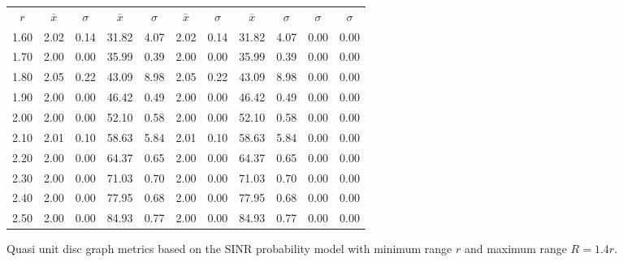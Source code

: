 \documentclass{article}
\begin{document}
\begin{figure}[h]
\begin{center}
\begin{tabular}{|r|rr|rr|rr|rr|rr|}
\hline
\multicolumn{1}{|c|}{$r$} & \multicolumn{1}{|c}{$\overline{x}$} & \multicolumn{1}{c|}{$\sigma$} & \multicolumn{1}{|c}{$\overline{x}$} & \multicolumn{1}{c|}{$\sigma$} & \multicolumn{1}{|c}{$\overline{x}$} & \multicolumn{1}{c|}{$\sigma$} & \multicolumn{1}{|c}{$\overline{x}$} & \multicolumn{1}{c|}{$\sigma$} & \multicolumn{1}{|c}{$\sigma$} & \multicolumn{1}{c|}{$\sigma$}\\
1.60 & 2.02 & 0.14 & 31.82 & 4.07 & 2.02 & 0.14 & 31.82 & 4.07 & 0.00 & 0.00\\
1.70 & 2.00 & 0.00 & 35.99 & 0.39 & 2.00 & 0.00 & 35.99 & 0.39 & 0.00 & 0.00\\
1.80 & 2.05 & 0.22 & 43.09 & 8.98 & 2.05 & 0.22 & 43.09 & 8.98 & 0.00 & 0.00\\
1.90 & 2.00 & 0.00 & 46.42 & 0.49 & 2.00 & 0.00 & 46.42 & 0.49 & 0.00 & 0.00\\
2.00 & 2.00 & 0.00 & 52.10 & 0.58 & 2.00 & 0.00 & 52.10 & 0.58 & 0.00 & 0.00\\
2.10 & 2.01 & 0.10 & 58.63 & 5.84 & 2.01 & 0.10 & 58.63 & 5.84 & 0.00 & 0.00\\
2.20 & 2.00 & 0.00 & 64.37 & 0.65 & 2.00 & 0.00 & 64.37 & 0.65 & 0.00 & 0.00\\
2.30 & 2.00 & 0.00 & 71.03 & 0.70 & 2.00 & 0.00 & 71.03 & 0.70 & 0.00 & 0.00\\
2.40 & 2.00 & 0.00 & 77.95 & 0.68 & 2.00 & 0.00 & 77.95 & 0.68 & 0.00 & 0.00\\
2.50 & 2.00 & 0.00 & 84.93 & 0.77 & 2.00 & 0.00 & 84.93 & 0.77 & 0.00 & 0.00\\
\hline
\end{tabular}
\caption{Quasi unit disc graph metrics based on the SINR probability model with minimum range $r$ and maximum range $R = 1.4r$.}
\label{exp_quasi}
\end{center}
\end{figure}
\end{document}
